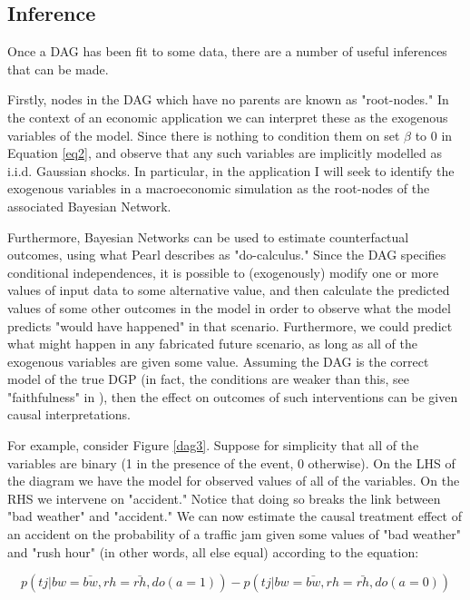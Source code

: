 \documentclass{article}
\begin{document}
\subsection{Inference}
Once a DAG has been fit to some data, there are a number of useful inferences that can be made. 

Firstly, nodes in the DAG which have no parents are known as "root-nodes." In the context of an economic application we can interpret these as the exogenous variables of the model. Since there is nothing to condition them on set $\beta$ to 0 in Equation \ref{eq2}, and observe that any such variables are implicitly modelled as i.i.d. Gaussian shocks. In particular, in the application I will seek to identify the exogenous variables in a macroeconomic simulation as the root-nodes of the associated Bayesian Network.

Furthermore, Bayesian Networks can be used to estimate counterfactual outcomes, using what Pearl \cite{pearl2009causality} describes as "do-calculus." Since the DAG specifies conditional independences, it is possible to (exogenously) modify one or more values of input data to some alternative value, and then calculate the predicted values of some other outcomes in the model in order to observe what the model predicts "would have happened" in that scenario. Furthermore, we could predict what might happen in any fabricated future scenario, as long as all of the exogenous variables are given some value. Assuming the DAG is the correct model of the true DGP (in fact, the conditions are weaker than this, see "faithfulness" in \cite{pearl2009causality}), then the effect on outcomes of such interventions can be given causal interpretations. 

For example, consider Figure \ref{dag3}. Suppose for simplicity that all of the variables are binary (1 in the presence of the event, 0 otherwise). On the LHS of the diagram we have the model for observed values of all of the variables. On the RHS we intervene on "accident." Notice that doing so breaks the link between "bad weather" and "accident." We can now estimate the causal treatment effect of an accident on the probability of a traffic jam given some values of "bad weather" and "rush hour" (in other words, all else equal) according to the equation:

\begin{equation}
    \label{eq3}
    p(tj | bw = \bar{bw}, rh = \bar{rh}, do(a=1)) - p(tj | bw = \bar{bw}, rh = \bar{rh}, do(a=0))
\end{equation}
\end{document}
